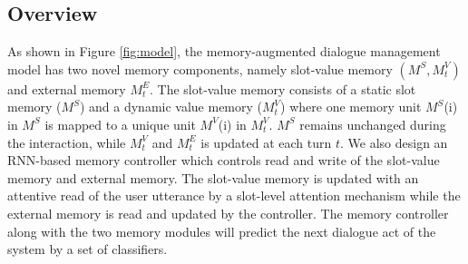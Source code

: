 





\subsection{Overview}

As shown in Figure \ref{fig:model}, the memory-augmented dialogue management model has two novel memory components, namely slot-value memory $(M^S,M_t^V)$ and external memory $M_t^E$. The slot-value memory consists of a static slot memory ($M^S$) and a dynamic value memory ($M_t^V$) where one memory unit $M^S$(i) in $M^S$ is mapped to a unique unit $M^V$(i) in $M_t^V$. $M^S$ remains unchanged during the interaction, while $M_t^V$ and $M_t^E$ is updated at each turn $t$.
We also design an RNN-based memory controller which controls read and write of the slot-value memory and external memory. 
The slot-value memory is updated with an attentive read of the user utterance by a slot-level attention mechanism while the external memory is read and updated by the controller. The memory controller along with the two memory modules will predict the next dialogue act of the system by a set of classifiers.

